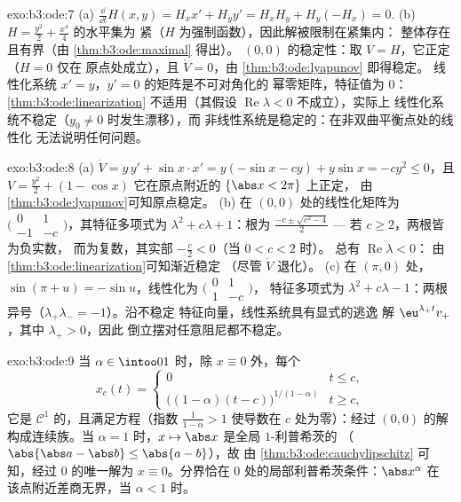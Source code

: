 \begin{solution}{exo:b3:ode:7}
(a) $\frac{\dd}{\dd t}H(x,y) = H_xx' + H_yy' = H_xH_y +
H_y(-H_x) = 0$.
(b) $H = \frac{y^2}2 + \frac{x^4}4$ 的水平集为
紧（$H$ 为强制函数），因此解被限制在紧集内：
整体存在且有界（由 \cref{thm:b3:ode:maximal} 得出）。
$(0,0)$ 的稳定性：取 $V = H$，它正定（$H = 0$ 仅在
原点处成立），且 $\dot V = 0$，由 \cref{thm:b3:ode:lyapunov} 即得稳定。
线性化系统 $x' = y$，$y' = 0$ 的矩阵是不可对角化的
幂零矩阵，特征值为 $0$：
\cref{thm:b3:ode:linearization} 不适用（其假设
$\operatorname{Re}\lambda < 0$ 不成立），实际上
线性化系统不稳定（$y_0 \ne 0$ 时发生漂移），而
非线性系统是稳定的：在非双曲平衡点处的线性化
无法说明任何问题。
\end{solution}

\begin{solution}{exo:b3:ode:8}
(a) $\dot V = y\,y' + \sin x\cdot x' = y(-\sin x - cy) +
y\sin x = -cy^2 \leq 0$，且 $V = \frac{y^2}2 + (1 - \cos x)$
它在原点附近的 $\{\abs x < 2\pi\}$ 上正定，
由\cref{thm:b3:ode:lyapunov}可知原点稳定。
(b) 在 $(0,0)$ 处的线性化矩阵为
$\bigl(\begin{smallmatrix}0 & 1\\ -1 &
-c\end{smallmatrix}\bigr)$，其特征多项式为
$\lambda^2 + c\lambda + 1$：根为 $\frac{-c \pm \sqrt{c^2 -
4}}2$ --- 若 $c \geq 2$，两根皆为负实数，
而为复数，其实部 $-\frac c2 < 0$（当 $0 < c < 2$ 时）。
总有 $\operatorname{Re}\lambda < 0$：
由\cref{thm:b3:ode:linearization}可知渐近稳定
（尽管 $\dot V$ 退化）。
(c) 在 $(\pi, 0)$ 处，$\sin(\pi + u) = -\sin u$，线性化为
$\bigl(\begin{smallmatrix}0&1\\1&-c\end{smallmatrix}\bigr)$，
特征多项式为 $\lambda^2 + c\lambda - 1$：两根
异号（$\lambda_+\lambda_- = -1$）。沿不稳定
特征向量，线性系统具有显式的逃逸
解 $\eu^{\lambda_+t}v_+$，其中 $\lambda_+ > 0$，因此
倒立摆对任意阻尼都不稳定。
\end{solution}

\begin{solution}{exo:b3:ode:9}
当 $\alpha \in \intoo01$ 时，除 $x \equiv 0$ 外，每个
\[
x_c(t) = \begin{cases}0 & t \leq c,\\
\bigl((1-\alpha)(t - c)\bigr)^{1/(1-\alpha)} & t \geq c,
\end{cases}
\]
它是 $\mathcal C^1$ 的，且满足方程（指数
$\frac1{1-\alpha} > 1$ 使导数在 $c$ 处为零）：经过
$(0,0)$ 的解构成连续族。当 $\alpha = 1$ 时，$x
\mapsto \abs x$ 是全局 $1$-利普希茨的
（$\abs{\abs a - \abs b} \leq \abs{a - b}$），故
由 \cref{thm:b3:ode:cauchylipschitz} 可知，经过
$0$ 的唯一解为 $x \equiv 0$。分界恰在
$0$ 处的局部利普希茨条件：$\abs x^\alpha$ 在
该点附近差商无界，当 $\alpha < 1$ 时。
\end{solution}


